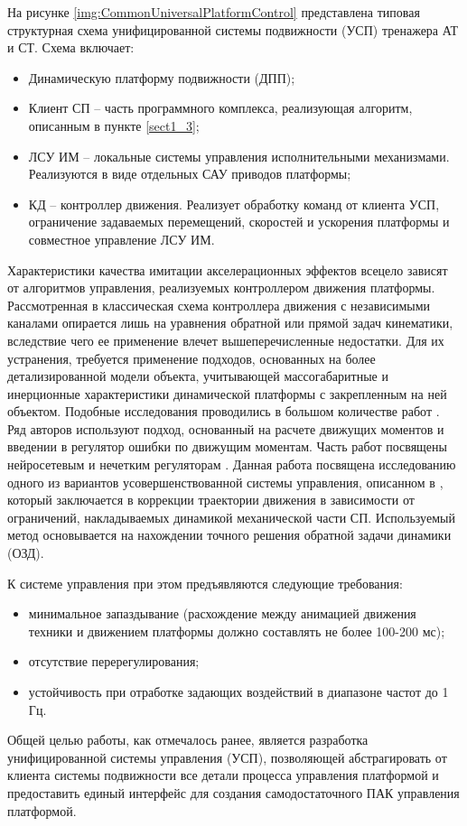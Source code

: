 На рисунке \ref{img:CommonUniversalPlatformControl} представлена типовая структурная схема унифицированной  системы подвижности (УСП) тренажера АТ и СТ. Схема включает:
\begin{itemize}
\item Динамическую платформу подвижности (ДПП);
\item Клиент СП -- часть программного комплекса, реализующая алгоритм, описанным в пункте \ref{sect1_3};
\item ЛСУ ИМ -- локальные системы управления исполнительными механизмами. Реализуются в виде отдельных САУ  приводов платформы;
\item КД -- контроллер движения. Реализует обработку команд от клиента УСП, ограничение задаваемых перемещений, скоростей и ускорения платформы и совместное управление ЛСУ ИМ.
\end{itemize}

Характеристики качества имитации акселерационных эффектов всецело зависят от алгоритмов управления, реализуемых контроллером движения платформы.
Рассмотренная в \cite{VarkovPhD,vakbib1,vakbib2} классическая схема контроллера движения с независимыми каналами опирается лишь на уравнения обратной или прямой задач кинематики, вследствие чего ее применение влечет вышеперечисленные недостатки. Для их устранения, требуется применение подходов, основанных на более детализированной модели объекта, учитывающей массогабаритные и инерционные характеристики динамической платформы с закрепленным на ней объектом. Подобные исследования проводились в большом количестве работ \cite{Merlet2006, Meng2010, Lukanin2005, Lee2003, He2007}. Ряд авторов используют подход, основанный на расчете движущих моментов и введении в регулятор ошибки по движущим моментам. Часть работ посвящены нейросетевым и нечетким регуляторам \cite{Wang,Singh2014,Salisbury2016}. Данная работа посвящена исследованию одного из вариантов усовершенствованной системы управления, описанном в \cite{Zenkevich2004}, который заключается в коррекции траектории движения в зависимости от ограничений, накладываемых динамикой механической части СП. Используемый метод основывается на нахождении точного решения обратной задачи динамики (ОЗД).

К системе управления при этом предъявляются следующие требования:
\begin{itemize}
	\item минимальное запаздывание \cite{Dubey2012,Rekdalsbakken2006} (расхождение между анимацией движения техники и движением платформы должно составлять не более 100-200 мс);
	\item отсутствие перерегулирования;
	\item устойчивость при отработке задающих воздействий в диапазоне частот до 1 Гц.
\end{itemize}

Общей целью работы, как отмечалось ранее, является разработка унифицированной системы управления (УСП), позволяющей абстрагировать от клиента системы подвижности все детали процесса управления платформой и предоставить единый интерфейс для создания самодостаточного ПАК управления платформой.